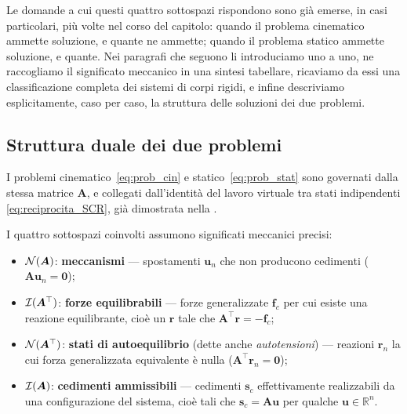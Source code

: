 Le domande a cui questi quattro sottospazi rispondono sono già
emerse, in casi particolari, più volte nel corso del capitolo:
quando il problema cinematico ammette soluzione, e quante ne
ammette; quando il problema statico ammette soluzione, e quante.
Nei paragrafi che seguono li introduciamo uno a uno, ne raccogliamo il significato
meccanico in una sintesi tabellare,
ricaviamo da essi una classificazione completa dei sistemi di
corpi rigidi, e infine descriviamo
esplicitamente, caso per caso, la struttura delle soluzioni dei
due problemi.


\subsection{Struttura duale dei due problemi}\label{sec:dualita_cin_stat}

I problemi cinematico~\eqref{eq:prob_cin} e statico~\eqref{eq:prob_stat}
sono governati dalla stessa matrice $\bm{A}$, e collegati
dall'identità del lavoro virtuale tra stati indipendenti
\eqref{eq:reciprocita_SCR}, già dimostrata nella .

I quattro sottospazi coinvolti assumono significati meccanici precisi:
\begin{itemize}[nosep]
	\item $\mathcal{N}(\bm{A})$: \textbf{meccanismi} --- spostamenti $\bm{u}_n$ che
	non producono cedimenti ($\bm{A}\bm{u}_n = \bm{0}$);
	\item $\mathcal{I}(\bm{A}^\top)$: \textbf{forze equilibrabili} --- forze
	generalizzate $\bm{f}_c$ per cui esiste una reazione equilibrante,
	cioè un $\bm{r}$ tale che $\bm{A}^\top\bm{r}=-\bm{f}_c$;
	\item $\mathcal{N}(\bm{A}^\top)$: \textbf{stati di autoequilibrio}
	(dette anche \emph{autotensioni}) --- reazioni $\bm{r}_n$ la cui
	forza generalizzata equivalente è nulla ($\bm{A}^\top\bm{r}_n = \bm{0}$);
	\item $\mathcal{I}(\bm{A})$: \textbf{cedimenti ammissibili} --- cedimenti
	$\bm{s}_c$ effettivamente realizzabili da una configurazione del
	sistema, cioè tali che $\bm{s}_c=\bm{A}\bm{u}$ per qualche
	$\bm{u}\in\mathbb R^n$.
\end{itemize}

